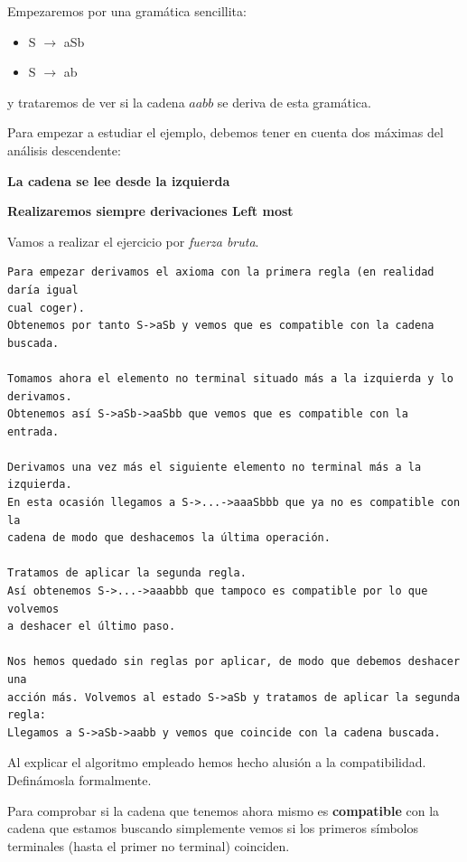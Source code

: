\documentclass{apuntes}
\begin{document}
\begin{example}
Empezaremos por una gramática sencillita:
\begin{itemize}
\item S $\rightarrow$ aSb
\item S $\rightarrow$ ab
\end{itemize}
y trataremos de ver si la cadena $aabb$ se deriva de esta gramática.

Para empezar a estudiar el ejemplo, debemos tener en cuenta dos máximas del análisis descendente:

\textbf{La cadena se lee desde la izquierda}

\textbf{Realizaremos siempre derivaciones Left most}

Vamos a realizar el ejercicio por \textit{fuerza bruta}.
\begin{verbatim}
Para empezar derivamos el axioma con la primera regla (en realidad daría igual
cual coger).
Obtenemos por tanto S->aSb y vemos que es compatible con la cadena buscada.

Tomamos ahora el elemento no terminal situado más a la izquierda y lo derivamos.
Obtenemos así S->aSb->aaSbb que vemos que es compatible con la entrada.

Derivamos una vez más el siguiente elemento no terminal más a la izquierda.
En esta ocasión llegamos a S->...->aaaSbbb que ya no es compatible con la
cadena de modo que deshacemos la última operación.

Tratamos de aplicar la segunda regla.
Así obtenemos S->...->aaabbb que tampoco es compatible por lo que volvemos
a deshacer el último paso.

Nos hemos quedado sin reglas por aplicar, de modo que debemos deshacer una
acción más. Volvemos al estado S->aSb y tratamos de aplicar la segunda regla:
Llegamos a S->aSb->aabb y vemos que coincide con la cadena buscada.
\end{verbatim}
\end{example}

Al explicar el algoritmo empleado hemos hecho alusión a la compatibilidad. Definámosla formalmente.

\begin{defn}[Compatibilidad]
Para comprobar si la cadena que tenemos ahora mismo es \textbf{compatible} con la cadena que estamos buscando simplemente vemos si los primeros símbolos terminales (hasta el primer no terminal) coinciden.
\end{defn}
\end{document}

